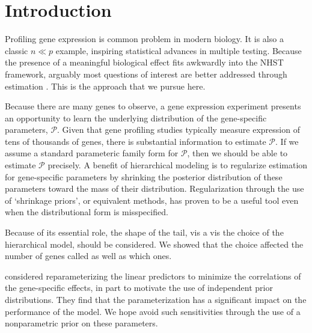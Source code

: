 \newcommand{\op}{\operatorname}
\newcommand{\ind}{\stackrel{ind.}{\sim}}
\section{Introduction}
Profiling gene expression is common problem in modern biology. It is also a classic $n \ll p$ example, inspiring statistical advances in multiple testing. Because the presence of a meaningful biological effect fits awkwardly into the NHST framework, arguably most questions of interest are better addressed through estimation \citet{deseq2014}. This is the approach that we pursue here.


Because there are many genes to observe, a gene expression experiment presents an opportunity to learn the underlying distribution of the gene-specific parameters, $\mathcal{P}$. Given that gene profiling studies typically measure expression of tens of thousands of genes, there is substantial information to estimate $\mathcal{P}$. If we assume a standard parameteric family form for $\mathcal{P}$, then we should be able to estimate $\mathcal{P}$ precisely.
A benefit of hierarchical modeling is to regularize estimation for gene-specific parameters by shrinking the posterior distribution of these parameters toward the mass of their distribution. Regularization through the use of `shrinkage priors', or equivalent methods, has proven to be a useful tool even when the distributional form is misspecified.

Because of its essential role, the shape of the tail, vis a vis the choice of the hierarchical model, should be considered. We showed that the choice affected the number of genes called as well as which ones.

\citet*{lithio} considered reparameterizing the linear predictors to minimize the correlations of the gene-specific effects, in part to motivate the use of independent prior distributions. They find that the parameterization has a significant impact on the performance of the model. We hope avoid such sensitivities through the use of a nonparametric prior on these parameters.


